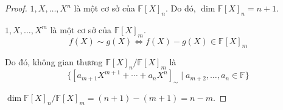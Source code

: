 \begin{proof}
    $1, X, \ldots, X^{n}$ là một cơ sở của ${\mathbb{F}[X]}_{n}$. Do đó, $\dim {\mathbb{F}[X]}_{n} = n + 1$.
    
    $1, X, \ldots, X^{m}$ là một cơ sở của ${\mathbb{F}[X]}_{m}$.
    \[ f(X)\sim g(X) \Longleftrightarrow f(X) - g(X) \in {\mathbb{F}[X]}_{m} \]
    
    Do đó, không gian thương ${\mathbb{F}[X]}_{n}/{\mathbb{F}[X]}_{m}$ là
    \[ \{ {[a_{m+1}X^{m+1} + \cdots + a_{n}X^{n}]}_{\sim} \mid a_{m+2}, \ldots, a_{n}\in\mathbb{F} \} \]
    
    $\dim{\mathbb{F}[X]}_{n}/{\mathbb{F}[X]}_{m} = (n + 1) - (m + 1) = n - m$.
\end{proof}


